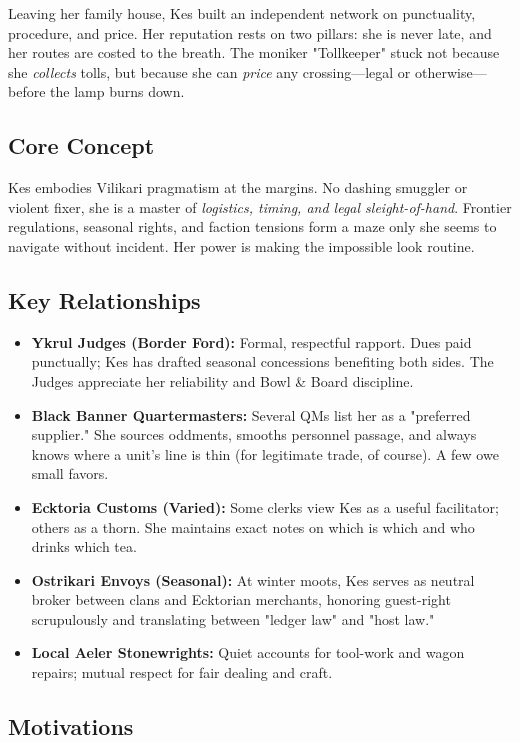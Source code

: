 Leaving her family house, Kes built an independent network on punctuality, procedure, and price. Her reputation rests on two pillars: she is never late, and her routes are costed to the breath. The moniker "Tollkeeper" stuck not because she \emph{collects} tolls, but because she can \emph{price} any crossing---legal or otherwise---before the lamp burns down.

\subsection*{Core Concept}

Kes embodies Vilikari pragmatism at the margins. No dashing smuggler or violent fixer, she is a master of \emph{logistics, timing, and legal sleight-of-hand}. Frontier regulations, seasonal rights, and faction tensions form a maze only she seems to navigate without incident. Her power is making the impossible look routine.

\subsection*{Key Relationships}

\begin{itemize}
    \item \textbf{Ykrul Judges (Border Ford):} Formal, respectful rapport. Dues paid punctually; Kes has drafted seasonal concessions benefiting both sides. The Judges appreciate her reliability and Bowl \& Board discipline.
    \item \textbf{Black Banner Quartermasters:} Several QMs list her as a "preferred supplier." She sources oddments, smooths personnel passage, and always knows where a unit's line is thin (for legitimate trade, of course). A few owe small favors.
    \item \textbf{Ecktoria Customs (Varied):} Some clerks view Kes as a useful facilitator; others as a thorn. She maintains exact notes on which is which and who drinks which tea.
    \item \textbf{Ostrikari Envoys (Seasonal):} At winter moots, Kes serves as neutral broker between clans and Ecktorian merchants, honoring guest-right scrupulously and translating between "ledger law" and "host law."
    \item \textbf{Local Aeler Stonewrights:} Quiet accounts for tool-work and wagon repairs; mutual respect for fair dealing and craft.
\end{itemize}

\subsection*{Motivations}

